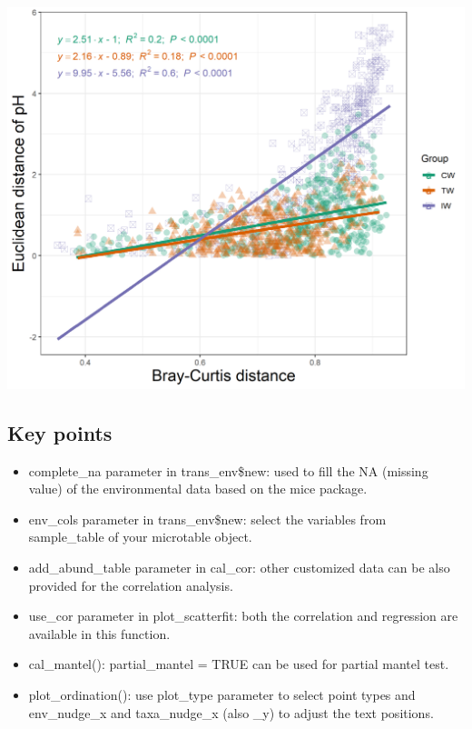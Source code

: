 \documentclass[
]{book}
\providecommand{\tightlist}{%
  \setlength{\itemsep}{0pt}\setlength{\parskip}{0pt}}
\begin{document}
\begin{center}\includegraphics[width=550px]{Images/plot_scatterfit_lmgroup} \end{center}

\hypertarget{key-points-9}{%
\subsection{Key points}\label{key-points-9}}

\begin{itemize}
\tightlist
\item
  complete\_na parameter in trans\_env\$new: used to fill the NA (missing value) of the environmental data based on the mice package.
\item
  env\_cols parameter in trans\_env\$new: select the variables from sample\_table of your microtable object.
\item
  add\_abund\_table parameter in cal\_cor: other customized data can be also provided for the correlation analysis.
\item
  use\_cor parameter in plot\_scatterfit: both the correlation and regression are available in this function.
\item
  cal\_mantel(): partial\_mantel = TRUE can be used for partial mantel test.
\item
  plot\_ordination(): use plot\_type parameter to select point types and env\_nudge\_x and taxa\_nudge\_x (also \_y) to adjust the text positions.
\end{itemize}
\end{document}
